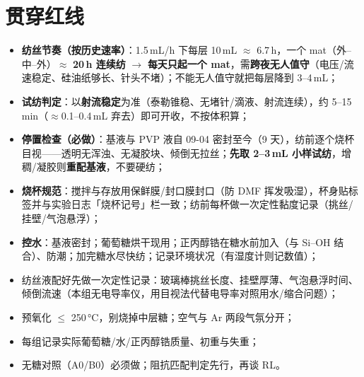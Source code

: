 \documentclass[a4paper, 11pt]{ctexart}
\begin{document}
\section*{贯穿红线}
\begin{itemize}[itemsep=1pt, parsep=0pt]
  \item \textbf{纺丝节奏（按历史速率）}：1.5\,mL/h 下每层 10\,mL $\approx$ 6.7\,h，一个 mat（外--中--外）$\approx$ \textbf{20\,h 连续纺} $\rightarrow$ \textbf{每天只起一个 mat}，需\textbf{跨夜无人值守}（电压/流速稳定、硅油纸够长、针头不堵）；不能无人值守就把每层降到 3--4\,mL；
  \item \textbf{试纺判定}：以\textbf{射流稳定}为准（泰勒锥稳、无堵针/滴液、射流连续），约 5--15\,min（$\approx$0.1--0.4\,mL 弃去）即可开收，不按体积算；
  \item \textbf{停置检查（必做）}：基液与 PVP 液自 09-04 密封至今（9 天），纺前逐个烧杯目视——透明无浑浊、无凝胶块、倾倒无拉丝；\textbf{先取 2--3\,mL 小样试纺}，增稠/凝胶则\textbf{重配基液}，不要硬纺；
  \item \textbf{烧杯规范}：搅拌与存放用保鲜膜/封口膜封口（防 DMF 挥发吸湿），杯身贴标签并与实验日志「烧杯记号」栏一致；纺前每杯做一次定性黏度记录（挑丝/挂壁/气泡悬浮）；
  \item \textbf{控水}：基液密封；葡萄糖烘干现用；正丙醇锆在糖水前加入（与 Si--OH 结合）、防潮；加完糖水尽快纺；记录环境状况（有湿度计则记数值）；
  \item 纺丝液配好先做一次定性记录：玻璃棒挑丝长度、挂壁厚薄、气泡悬浮时间、倾倒流速（本组无电导率仪，用目视法代替电导率对照用水/缩合问题）；
  \item 预氧化 $\le$ 250\,°C，别烧掉中层糖；空气与 Ar 两段气氛分开；
  \item 每组记录实际葡萄糖/水/正丙醇锆质量、初重与失重；
  \item 无糖对照（A0/B0）必须做；阻抗匹配判定先行，再谈 RL。
\end{itemize}
\end{document}
